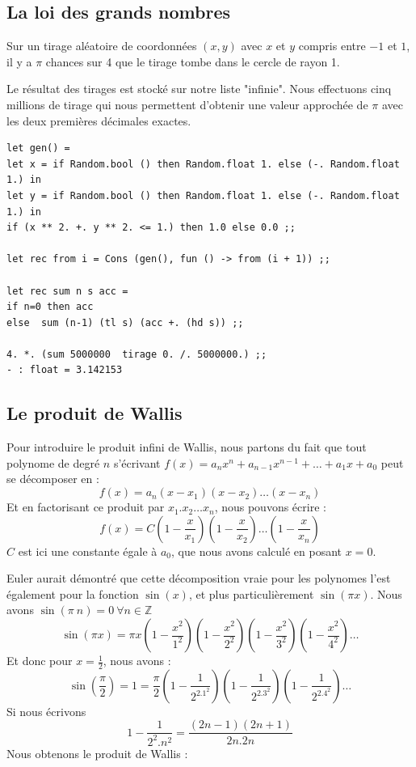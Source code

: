 \documentclass[11pt]{book}
\begin{document}
\subsection{La loi des grands nombres}
Sur un tirage aléatoire de coordonnées $(x,y)$ avec $x$ et $y$ compris entre $-1$ et $1$,
il y a  $\pi$ chances sur 4 que le tirage tombe dans le cercle de rayon 1.
\begin{center}
\vspace{0.5cm}
\end{center} 

Le résultat des tirages est stocké sur notre liste "infinie". Nous effectuons cinq millions de tirage qui nous
permettent d'obtenir une valeur approchée de $\pi$  avec les deux premières décimales exactes.
\begin{Verbatim}
let gen() = 
let x = if Random.bool () then Random.float 1. else (-. Random.float 1.) in
let y = if Random.bool () then Random.float 1. else (-. Random.float 1.) in
if (x ** 2. +. y ** 2. <= 1.) then 1.0 else 0.0 ;;

let rec from i = Cons (gen(), fun () -> from (i + 1)) ;;

let rec sum n s acc =
if n=0 then acc
else  sum (n-1) (tl s) (acc +. (hd s)) ;;
  
4. *. (sum 5000000  tirage 0. /. 5000000.) ;;
- : float = 3.142153
\end{Verbatim}

\subsection{Le produit de Wallis}
Pour introduire le produit infini de Wallis, nous partons du fait que tout polynome
de degré $n$ s'écrivant $f(x) = a_n x^n + a_{n-1} x^{n-1}+ \dots + a_1 x + a_0$ peut se décomposer en :
$$ f(x) = a_n(x-x_1)(x-x_2)\dots(x-x_n)$$
Et en factorisant ce produit par $x_1.x_2\dots x_n$, nous pouvons écrire :
$$ f(x) = C (1-\frac{x}{x_1})(1-\frac{x}{x_2})\dots(1-\frac{x}{x_n}) $$ 
$C$ est ici une constante égale à $a_0$, que nous avons calculé en posant $x=0$.

Euler aurait démontré que cette décomposition vraie pour les polynomes l'est également pour la fonction $\sin(x)$, et plus
particulièrement $\sin(\pi x)$. Nous avons $\sin(\pi\ n)=0\ \forall n \in \mathbb{Z}$
$$\sin (\pi x) = \pi x (1-\frac{x^2}{1^2})(1-\frac{x^2}{2^2})(1-\frac{x^2}{3^2})(1-\frac{x^2}{4^2})\dots $$
Et donc pour $x=\frac{1}{2}$, nous avons :
$$\sin (\frac{\pi}{2}) = 1 = \frac{\pi}{2} (1-\frac{1}{2^2.1^2}) (1-\frac{1}{2^2.3^2}) (1-\frac{1}{2^2.4^2}) \dots $$
Si nous écrivons 
$$1-\frac{1}{2^2.n^2} = \frac{(2n-1)(2n+1)}{2n.2n} $$
Nous obtenons le produit de Wallis :
\end{document}
